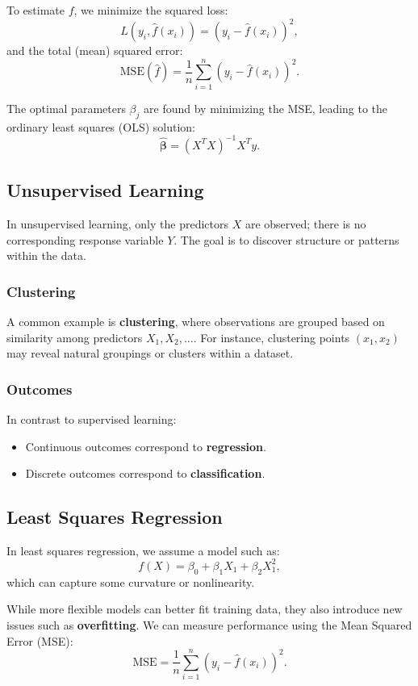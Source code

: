 To estimate \( f \), we minimize the squared loss:
\[
L(y_i, \hat{f}(x_i)) = (y_i - \hat{f}(x_i))^2,
\]
and the total (mean) squared error:
\[
\text{MSE}(\hat{f}) = \frac{1}{n}\sum_{i=1}^{n}(y_i - \hat{f}(x_i))^2.
\]

The optimal parameters \( \beta_j \) are found by minimizing the MSE, leading to the ordinary least squares (OLS) solution:
\[
\hat{\boldsymbol{\beta}} = (X^T X)^{-1} X^T y.
\]

\subsection{Unsupervised Learning}

In unsupervised learning, only the predictors \( X \) are observed; there is no corresponding response variable \( Y \).  
The goal is to discover structure or patterns within the data.

\subsubsection{Clustering}
A common example is \textbf{clustering}, where observations are grouped based on similarity among predictors \( X_1, X_2, \ldots \).  
For instance, clustering points \( (x_1, x_2) \) may reveal natural groupings or clusters within a dataset.

\subsubsection{Outcomes}
In contrast to supervised learning:
\begin{itemize}
    \item Continuous outcomes correspond to \textbf{regression}.
    \item Discrete outcomes correspond to \textbf{classification}.
\end{itemize}

\subsection{Least Squares Regression}

In least squares regression, we assume a model such as:
\[
f(X) = \beta_0 + \beta_1 X_1 + \beta_2 X_1^2,
\]
which can capture some curvature or nonlinearity.

While more flexible models can better fit training data, they also introduce new issues such as \textbf{overfitting}.  
We can measure performance using the Mean Squared Error (MSE):
\[
\text{MSE} = \frac{1}{n}\sum_{i=1}^{n} (y_i - \hat{f}(x_i))^2.
\]


